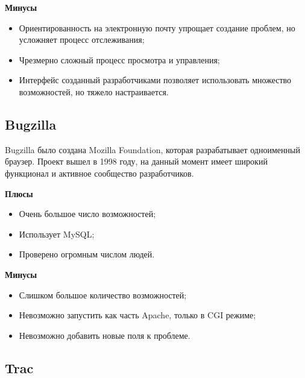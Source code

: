 
\textbf{Минусы}

\begin{itemize}

\item Ориентированность на электронную почту упрощает создание проблем, но усложняет процесс отслеживания;

\item Чрезмерно сложный процесс просмотра и управления;

\item Интерфейс созданный разработчиками позволяет использовать множество возможностей, но тяжело настраивается.

\end{itemize}


\subsection{ Bugzilla } \label{sect3_16_4}

Bugzilla было создана Mozilla Foundation, которая разрабатывает одноименный браузер. Проект вышел в 1998 году, на данный момент имеет широкий функционал и активное сообщество разработчиков.

\textbf{Плюсы}

\begin{itemize}

\item Очень большое число возможностей;

\item Использует MySQL;

\item Проверено огромным числом людей.

\end{itemize}


\textbf{Минусы}

\begin{itemize}

\item Слишком большое количество возможностей;

\item Невозможно запустить как часть Apache, только в CGI режиме;

\item Невозможно добавить новые поля к проблеме.

\end{itemize}

\subsection{ Trac } \label{sect3_16_5}

